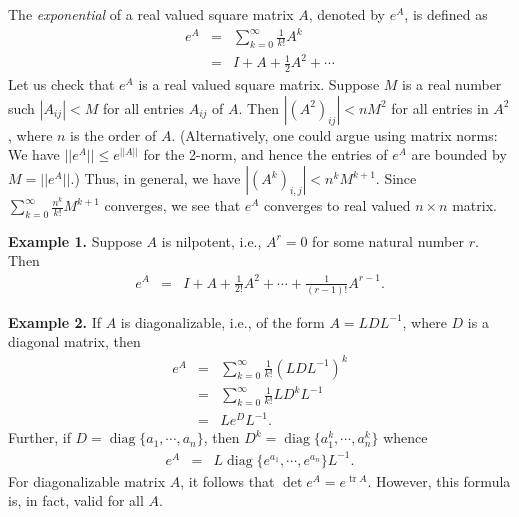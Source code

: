 \documentclass[12pt]{article}
\begin{document}
\newcommand{\diag}{\mathop{\mathrm{diag}}}
\newcommand{\trace}{\mathop{\mathrm{tr}}}

The \emph{exponential} of a real valued square matrix $A$, denoted 
by $e^A$, is defined as
\begin{eqnarray*}
e^A &=& \sum_{k=0}^\infty \frac{1}{k!}A^k \\
    &=& I + A + \frac{1}{2} A^2 + \cdots
\end{eqnarray*}
Let us check that $e^A$ is a real valued square matrix.
Suppose $M$ is a real number such $|A_{ij}| < M$ for all 
entries $A_{ij}$ of $A$. 
Then $|(A^2)_{ij}| < nM^2$ for all entries in $A^2$, 
where $n$ is the order of $A$. (Alternatively, one could argue using matrix norms:  We have $||e^A||\leq e^{||A||}$ for the 2-norm, and hence the entries of $e^A$ are bounded by $M=||e^A||$.)  Thus, 
in general, we have $|(A^k)_{i,j}| < n^k M^{k+1}$. Since
$\sum_{k=0}^\infty \frac{n^k}{k!} M^{k+1}$ converges, we see that
$e^A$ converges to real valued $n\times n$ matrix.  

{\bf Example 1.} Suppose $A$ is nilpotent, i.e., $A^r = 0$ for some natural 
number $r$. Then 
\begin{eqnarray*}
e^A &=& I + A + \frac{1}{2!} A^2 + \cdots + \frac{1}{(r-1)!} A^{r-1}. 
\end{eqnarray*}

{\bf Example 2.} If $A$ is diagonalizable, i.e., of the form 
$A=L D L^{-1}$, where $D$ is a diagonal matrix, then
\begin{eqnarray*}
e^A &=& \sum_{k=0}^\infty \frac{1}{k!}(LDL^{-1})^k \\
 &=& \sum_{k=0}^\infty \frac{1}{k!}LD^kL^{-1} \\ 
    &=& L e^D L^{-1}.
\end{eqnarray*}
Further, if 
$D=\diag\{a_1,\cdots, a_n\}$, then
 $D^k = \diag\{a_1^k, \cdots, a_n^k\}$ whence
\begin{eqnarray*}
e^A &=& L \diag\{e^{a_1}, \cdots, e^{a_n}\} L^{-1}.
\end{eqnarray*}
For diagonalizable matrix $A$, it follows that
$\det e^A = e^{\trace A}$.
However, this formula is, in fact, valid for all $A$. 
\end{document}
